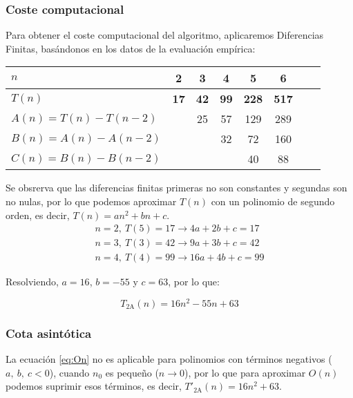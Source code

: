 \subsubsection*{Coste computacional}
Para obtener el coste computacional del algoritmo, aplicaremos Diferencias Finitas, basándonos en los datos de la evaluación empírica:


\begin{table}[h]
    \centering
    \begin{tabular}{|l|c|c|c|c|c|c|c|}
        \hline
        $n$ & \textbf{2} & \textbf{3} & \textbf{4} & \textbf{5} & \textbf{6}\\ \hline
        $T(n)$ & \textbf{17} & \textbf{42} & \textbf{99} & \textbf{228} & \textbf{517}      \\ \hline
        \hline
        $A(n) = T(n) - T(n-2)$ &    & 25 & 57 & 129 & 289 \\ \hline
        $B(n) = A(n) - A(n-2)$ &    &   & 32 & 72 & 160 \\ \hline
        $C(n) = B(n) - B(n-2)$ &    &   &    & 40 & 88 \\ \hline
    \end{tabular}
\end{table}

Se obsrerva que las diferencias finitas primeras no son constantes y segundas son no nulas, por lo que podemos aproximar $T(n)$ con un polinomio de segundo orden, es decir, $T(n) =  an^2 + bn + c$.\\

\begin{subequations}
    \begin{gather}
        n = 2,\ T(5) = 17 \rightarrow 4a + 2b + c = 17 \\
        n = 3,\ T(3) = 42 \rightarrow 9a + 3b + c = 42 \\
        n = 4,\ T(4) = 99 \rightarrow 16a + 4b + c = 99
    \end{gather}
\end{subequations}

Resolviendo, $a=16$, $b=-55$ y $c=63$, por lo que:

\begin{equation}
    T_{\mathrm{2A}}(n) = 16n^2 - 55n + 63
\end{equation}


\subsubsection*{Cota asintótica}
La ecuación \ref{eq:On} no es aplicable para polinomios con términos negativos ($a,\ b,\ c < 0$), cuando $n_0$ es pequeño ($n \rightarrow 0$), por lo que para aproximar $O(n)$ podemos suprimir esos términos, es decir, $T'_{\mathrm{2A}}(n) = 16n^2 + 63$.

